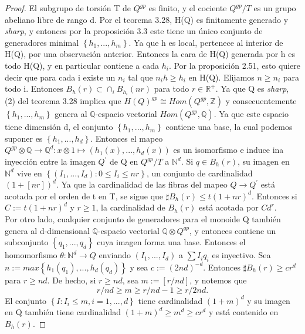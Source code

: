 \documentclass[12pt,spanish]{amsart}
\newcommand{\bb}[1]{\mathbb{#1}}
\newcommand{\set}[1]{\left\{{#1}\right\}}
\theoremstyle{definition}
\theoremstyle{remark}
\begin{document}
\begin{proof}
El subgrupo de torsión T de $Q^{gp}$ es finito, y el cociente $Q^{gp}/T$ es un grupo abeliano libre de rango d. Por el teorema 3.28, H(Q) es finitamente generado y \textit{sharp}, y entonces por la proposición 3.3 este tiene un único conjunto de generadores minimal $\set{h_{1},...,h_{m}}$. Ya que h es local, pertenece al interior de H(Q), por una observación anterior. Entonces la cara de H(Q) generada por h es todo H(Q), y en particular contiene a cada $h_{i}$. Por la proposición 2.51, esto quiere decir que para cada i existe un $n_{i}$ tal que $n_{i}h\geq h_{i}$ en H(Q). Elijamos $n\geq n_{i}$ para todo i. Entonces $B_{h}(r) \subset \cap_{i} B_{h_{i}}(nr)$ para todo $r\in \bb{R}^{+}$. Ya que Q es \textit{sharp}, (2) del teorema 3.28 implica que $H(Q)^{gp} \cong Hom(Q^{gp},\bb{Z})$ y consecuentemente $\set{h_{1},...,h_{m}}$ genera al $\bb{Q}$-espacio vectorial $Hom(Q^{gp},\bb{Q})$. Ya que este espacio tiene dimensión d, el conjunto $\set{h_{1},...,h_{m}}$ contiene una base, la cual podemos suponer es $\set{h_{1},...,h_{d}}$. Entonces el mapeo $Q^{gp}\otimes \bb{Q} \to \bb{Q}^{d}:x\otimes 1 \mapsto (h_{1}(x),...,h_{d}(x))$  es un isomorfismo e induce ina inyección entre la imagen $Q^{\prime}$ de Q en $Q^{gp}/T$ a $\bb{N}^{d}$. Si $q\in B_{h}(r)$, su imagen en $\bb{N}^{d}$ vive en $\set{(I_{1},...,I_{d}):0\leq I_{i} \leq nr}$, un conjunto de cardinalidad $(1+[nr])^{d}$. Ya que la cardinalidad de las fibras del mapeo $Q \to Q^{\prime}$ está acotada por el orden de t en T, se sigue que $\sharp B_{h}(r) \leq t(1+nr)^{d}$. Entonces si $C:= t(1+nr)^{d}$ y $r\geq 1$, la cardinalidad de $B_{h}(r)$ está acotada por $Cd^{r}$. \\ 
Por otro lado, cualquier conjunto de generadores para el monoide Q también genera al d-dimensional $\bb{Q}$-espacio vectorial $\bb{Q}\otimes Q^{gp}$, y entonces contiene un subconjunto $\set{q_{1},...,q_{d}}$ cuya imagen forma una base. Entonces el homomorfismo $\theta:\bb{N}^{d} \to Q$ enviando $(I_{1},...,I_{d})$ a $\sum I_{i}q_{i}$ es inyectivo. Sea $n:=max \set{h_{1}(q_{1}),...,h_{d}(q_{d})}$ y sea $c:=(2nd)^{-d}$. Entonces $\sharp B_{h}(r) \geq cr^{d}$ para $r \geq nd$. De hecho, si $r \geq nd$, sea $m:=[r/nd]$, y notemos que 
$$r/nd \geq m \geq r/nd-1 \geq r/2nd.$$
El conjunto $\set{I:I_{i}\leq m,i=1,...,d}$ tiene cardinalidad $(1+m)^{d}$ y su imagen en Q también tiene cardinalidad $(1+m)^{d} \geq m^{d} \geq cr^{d}$ y está contenido en $B_{h}(r)$. 
\end{proof}
\end{document}
